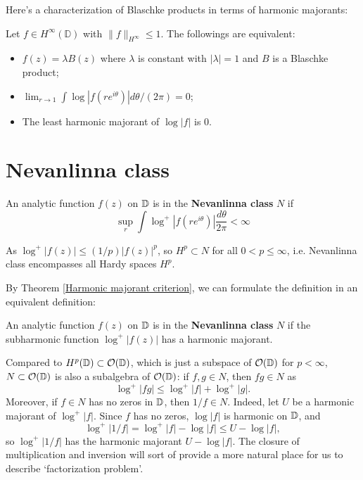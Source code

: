 Here's a characterization of Blaschke products in terms of harmonic majorants:
\begin{theorem}\label{characterization of Blaschke products}
Let $f\in H^\infty(\mathbb{D})$ with $\|f\|_{H^\infty}\leq 1$. The followings are equivalent:
\begin{itemize}
  \item[(a)] $f(z)=\lambda B(z)$ where $\lambda$ is constant with $|\lambda|=1$ and $B$ is a 
  Blaschke product;
  \item[(b)] $\lim_{r\rightarrow 1}\int \log |f(re^{i\theta})|d\theta/(2\pi)=0$;
  \item[(c)] The least harmonic majorant of $\log |f|$ is 0.
\end{itemize}
\end{theorem}

\section{Nevanlinna class} 
\begin{definition}
An analytic function $f(z)$ on $\mathbb{D}$ is in the \textbf{Nevanlinna class} $N$ if 
\begin{equation*}
  \sup_r \int \log^+|f(r e^{i\theta})|\frac{d\theta}{2\pi}<\infty
\end{equation*}
\end{definition}
As $\log^+|f(z)|\leq (1/p)|f(z)|^p$, so $H^p\subset N$ for all $0<p\leq \infty$, i.e. Nevanlinna
class encompasses all Hardy spaces $H^p$. 

By Theorem \ref{Harmonic majorant criterion}, we can formulate the definition
in an equivalent definition:
\begin{definition}
An analytic function $f(z)$ on $\mathbb{D}$ is in the \textbf{Nevanlinna class} $N$ if 
the subharmonic function $\log^+|f(z)|$ has a harmonic majorant.
\end{definition}

\begin{remark}\label{rem:N_algebra}
Compared to $H^p(\mathbb{D}) \subset \mathcal{O}(\mathbb{D})$,
which is just a subspace of $\mathcal{O}(\mathbb{D})$ for $p<\infty$, $N\subset \mathcal{O}(\mathbb{D})$ is
also a subalgebra of $\mathcal{O}(\mathbb{D})$: if $f,g\in N$, then $fg\in N$ as
\begin{equation*}
  \log^+|fg|\leq \log^+|f|+\log^+|g|.
\end{equation*}
Moreover, if $f\in N$ has no zeros in $\mathbb{D}$, then $1/f\in N$. Indeed, let $U$ be a harmonic
majorant of $\log^+|f|$. Since $f$ has no zeros, $\log|f|$ is harmonic on $\mathbb{D}$, and
\begin{equation*}
  \log^+|1/f|=\log^+|f|-\log|f|\leq U-\log|f|,
\end{equation*}
so $\log^+|1/f|$ has the harmonic majorant $U-\log|f|$.
The closure of multiplication and inversion will sort of provide a more natural place for us to 
describe `factorization problem'.
\end{remark}

